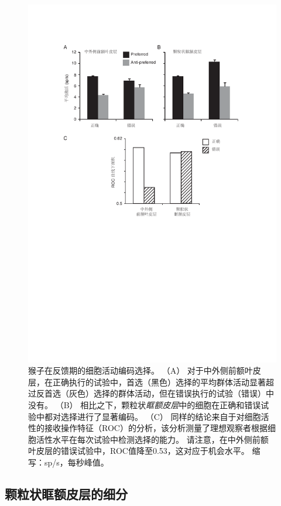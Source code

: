 \begin{figure}[!htb]
	\centering
	\includegraphics{chap4/fig_4_13}
	\caption{猴子在反馈期的细胞活动编码选择。
		（A） 对于中外侧前额叶皮层，在正确执行的试验中，首选（黑色）选择的平均群体活动显著超过反首选（灰色）选择的群体活动，但在错误执行的试验（错误）中没有。
		（B） 相比之下，颗粒状\textit{眶额皮层}中的细胞在正确和错误试验中都对选择进行了显著编码。
		（C） 同样的结论来自于对细胞活性的接收操作特征（ROC）的分析，该分析测量了理想观察者根据细胞活性水平在每次试验中检测选择的能力。
		请注意，在中外侧前额叶皮层的错误试验中，ROC值降至0.53，这对应于机会水平。
		缩写：sp/s，每秒峰值\cite{tsujimoto2011comparison}。}
	\label{fig:fig_4_13}
\end{figure}



\subsection{颗粒状眶额皮层的细分}

